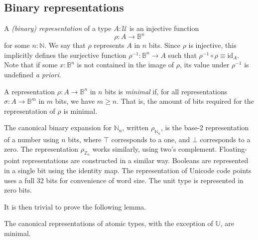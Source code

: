 \documentclass[UKenglish, 11pt, a4paper, parskip=half]{scrbook}
\begin{document}
\subsection{Binary representations}
\begin{defn}
    A \textit{(binary) representation} of a type \( A : \mathcal U \) is an injective function
    \[ \rho : A \to \mathbb B^n \]
    for some \( n : \mathbb N \).
    We say that \( \rho \) represents \( A \) in \( n \) bits.
    Since \( \rho \) is injective, this implicitly defines the surjective function \( \rho^{-1} : \mathbb B^n \to A \) such that \( \rho^{-1} \circ \rho \equiv \mathrm{id}_A \).
    Note that if some \( x : \mathbb B^n \) is not contained in the image of \( \rho \), its value under \( \rho^{-1} \) is undefined \textit{a priori}.
\end{defn}
\begin{defn}
    A representation \( \rho : A \to \mathbb B^n \) in \( n \) bits is \textit{minimal} if, for all representations \( \sigma : A \to \mathbb B^m \) in \( m \) bits, we have \( m \geq n \).
    That is, the amount of bits required for the representation of \( \rho \) is minimal.
\end{defn}
\begin{defn}
    The canonical binary expansion for \( \mathbb N_n \), written \( \rho_{\mathbb N_n} \), is the base-2 representation of a number using \( n \) bits, where \( \top \) corresponds to a one, and \( \bot \) corresponds to a zero.
    The representation \( \rho_{\mathbb Z_n} \) works similarly, using two's complement.
    Floating-point representations are constructed in a similar way.
    Booleans are represented in a single bit using the identity map.
    The representation of Unicode code points uses a full 32 bits for convenience of word size.
    The unit type is represented in zero bits.
\end{defn}
It is then trivial to prove the following lemma.
\begin{lem}
    The canonical representations of atomic types, with the exception of \( \mathbb U \), are minimal.
\end{lem}
\end{document}
